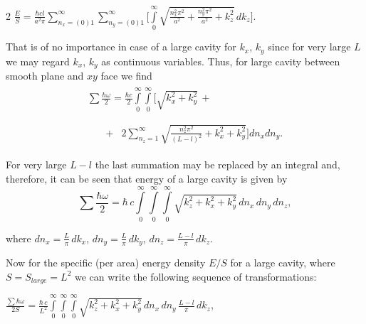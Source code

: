 \documentclass[twoside, 10pt]{article}
\begin{document}
\begin{multicols}{2}
\noindent
    \(\frac{E}{S} = \frac{\hbar c l}{a^2 \pi} \sum\limits_{n_x=(0)1}^{\infty}
\sum\limits_{n_y=(0)1}^{\infty}\Bigg[\int\limits_{0}^{\infty}\sqrt{\frac{n_x^2\pi^2}{a^2}+\frac{n_y^2\pi^2}{a^2}+k_z^2}\,dk_z\Bigg]\).

    That is of no importance in case of a large cavity for \(k_x\), \(k_y\)
since for very large \(L\) we may regard \(k_x\), \(k_y\) as
continuous variables. Thus, for large cavity between smooth plane and \(xy\) face we find
\noindent
\begin{equation}\begin{array}{l}
\begin{array}{ll}
\sum\frac{\hbar\omega}{2} = \frac{\hbar c}{2}\int\limits_{0}^{\infty}\int\limits_{0}^{\infty}\Bigg[\sqrt{k_x^2+k_y^2}\,+ & \,\\
\end{array} \\
\begin{array}{rr}
\,\,\,\,\,\,\,\,\,\,\,+ & 2\sum\limits_{n_z=1}^{\infty}\sqrt{\frac{n_z^2 \pi^2}{(L-l)^2}+k_x^2+k_y^2}\Bigg]d{n_x}d{n_y}.\end{array}
\end{array}\end{equation}


For very large \(L-l\) the last summation may be replaced by an
integral and, therefore, it can be seen that energy of a large cavity is given by
\noindent
\begin{equation}\sum\frac{\hbar\omega}{2} = \hbar\,c\int\limits_{0}^{\infty}\int\limits_{0}^{\infty}\int\limits_{0}^{\infty}\sqrt{k_z^2+k_x^2+k_y^2}\,d{n_x}\,d{n_y}\,d{n_z},\end{equation}

where \(dn_x = \frac{L}{\pi}\,dk_x\), \(dn_y = \frac{L}{\pi}\,dk_y\),
\(dn_z = \frac{L-l}{\pi}\,dk_z\).

    Now for the specific (per area) energy density \(E/S\) for a large cavity, where
\(S = S_{large} = L^2\) we can write the following sequence of transformations:

\noindent
\(\frac{\sum\hbar\omega}{2 S} = \frac{\hbar\,c}{L^2}\int\limits_{0}^{\infty}\int\limits_{0}^{\infty}\int\limits_{0}^{\infty}\sqrt{k_z^2+k_x^2+k_y^2}\,dn_x\,dn_y\,\frac{L-l}{\pi}\,dk_z\),


\end{multicols}
\end{document}
